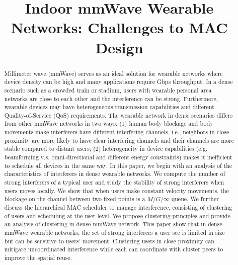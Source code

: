 \documentclass[10pt, conference, letterpaper]{IEEEtran}
\begin{document}
\title{Indoor mmWave Wearable Networks: Challenges to MAC Design}

\author{
}

\maketitle

\begin{abstract}
Millimeter wave (mmWave) serves as an ideal solution for wearable networks where device density can be high and many applications require Gbps throughput. In a dense scenario such as a crowded train or stadium, users with wearable personal area networks are close to each other and the interference can be strong. Furthermore, wearable devices may have heterogeneous transmission capabilities and different Quality-of-Service (QoS) requirements. The wearable network in dense scenarios differs from other mmWave networks in two ways: (1) human body blockage and body movements make interferers have different interfering channels, i.e., neighbors in close proximity are more likely to have clear interfering channels and their channels are more stable compared to distant users; (2) heterogeneity in device capabilities (e.g. beamforming v.s. omni-directional and different energy constraints) makes it inefficient to schedule all devices in the same way. In this paper, we begin with an analysis of the characteristics of interferers in dense wearable networks. We compute the number of strong interferers of a typical user and study the stability of strong interferers when users moves locally. We show that when users make constant velocity movements, the blockage on the channel between two fixed points is a $M/G/\infty$ queue. We further discuss the hierarchical MAC scheduler to manage interference, consisting of clustering of users and scheduling at the user level. We propose clustering principles and provide an analysis of clustering in dense mmWave network. This paper show that in dense mmWave wearable networks, the set of strong interferers a user see is limited in size but can be sensitive to users' movement. Clustering users in close proximity can mitigate uncoordinated interference while each can coordinate with cluster peers to improve the spatial reuse.

\end{abstract}
\IEEEpeerreviewmaketitle
\end{document}
